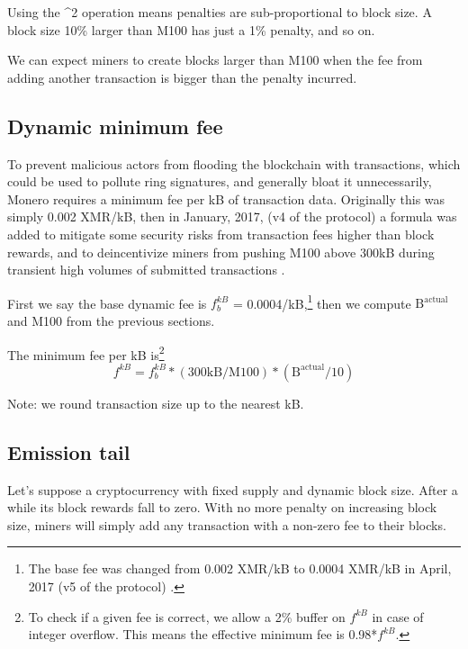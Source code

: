 Using the \^{}2 operation means penalties are sub-proportional to block size. A block size 10\% larger than M100 has just a 1\% penalty, and so on. \cite{monero-coin-emission}

We can expect miners to create blocks larger than M100 when the fee from adding another transaction is bigger than the penalty incurred.


\subsection{Dynamic minimum fee}
\label{subsec:dynamic-minimum-fee} %

To prevent malicious actors from flooding the blockchain with transactions, which could be used to pollute ring signatures, and generally bloat it unnecessarily, Monero requires a minimum fee per kB of transaction data. Originally this was simply 0.002 XMR/kB, then in January, 2017, (v4 of the protocol) a formula was added to mitigate some security risks from transaction fees higher than block rewards, and to deincentivize miners from pushing M100 above 300kB during transient high volumes of submitted transactions \cite{dynamic-per-kb-fee}.

First we say the base dynamic fee is $f^{kB}_b$ = 0.0004/kB,\footnote{The base fee was changed from 0.002 XMR/kB to 0.0004 XMR/kB in April, 2017 (v5 of the protocol) \cite{monero-v5}.} then we compute $\textrm{B}^{\textrm{actual}}$ and M100 from the previous sections.

The minimum fee per kB is\footnote{To check if a given fee is correct, we allow a 2\% buffer on $f^{kB}$ in case of integer overflow. This means the effective minimum fee is 0.98*$f^{kB}$.}
\[ f^{kB} = f^{kB}_b*(\textrm{300kB}/\textrm{M100})*(\textrm{B}^{\textrm{actual}}/10) \]

Note: we round transaction size up to the nearest kB.


\subsection{Emission tail}
\label{subsec:emission-tail}

Let's suppose a cryptocurrency with fixed supply and dynamic block size. After a while its block rewards fall to zero. With no more penalty on increasing block size, miners will simply add any transaction with a non-zero fee to their blocks. 

